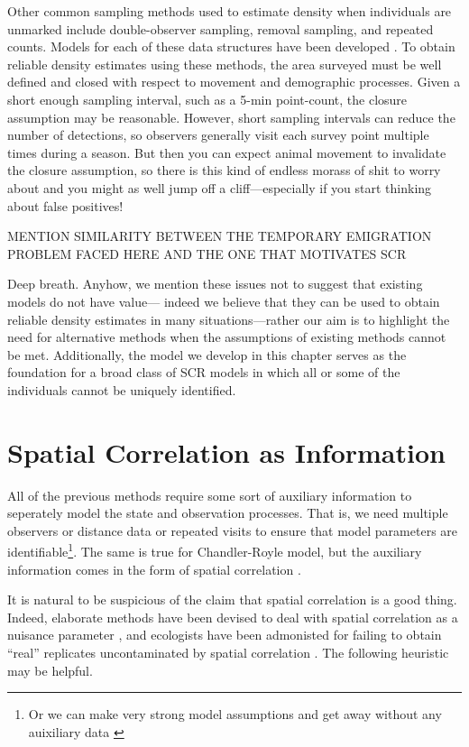 Other common sampling methods used to estimate density when individuals are
unmarked include double-observer sampling, removal sampling, and
repeated counts. Models for each of these data structures have been
developed
\citep{nichols_etal:2000,farnsworth_etal:2002,royle:2004,royle:2004abc}. To
obtain reliable density estimates using these
methods, the area surveyed must be well defined and closed with
respect to movement and demographic processes. Given a short enough
sampling interval, such as a 5-min point-count, the closure
assumption may be reasonable. However, short sampling intervals can
reduce the number of detections, so observers generally visit each survey
point multiple times during a season. But then you can expect animal
movement to invalidate the closure assumption, so there is this kind
of endless morass of shit to worry about and you might as well jump
off a cliff---especially if you start thinking about false positives!

MENTION SIMILARITY BETWEEN THE TEMPORARY EMIGRATION PROBLEM FACED HERE
AND THE ONE THAT MOTIVATES SCR

Deep breath. Anyhow, we mention these issues not to suggest that
existing models do not have value---
indeed we believe that they can be used to obtain reliable density
estimates in many situations---rather our aim is to highlight the need for
alternative methods when the assumptions of existing methods cannot be
met. Additionally, the model we develop in this chapter serves as the
foundation for a broad class of SCR models in which all or some of the
individuals cannot be uniquely identified.



\section{Spatial Correlation as Information}

All of the previous methods require some sort of auxiliary information
to seperately model the state and observation processes. That is, we
need multiple observers or distance data or repeated visits to ensure
that model parameters are identifiable\footnote{Or we can make very
  strong model assumptions and get away without any auixiliary data
  \citep{lele_etal:2012}}. The same is true for Chandler-Royle model,
but the auxiliary information comes in the form of spatial correlation
\citep{chandler_royle:2012}.

It is natural to be suspicious of the claim that spatial correlation
is a good thing. Indeed, elaborate methods have been devised to deal
with spatial correlation as a nuisance parameter
\citep{dormann_etal:2007}, and ecologists have been admonisted for
failing to obtain ``real'' replicates uncontaminated by spatial
correlation \citep{hurlbert:1984}. The following heuristic may be
helpful.


